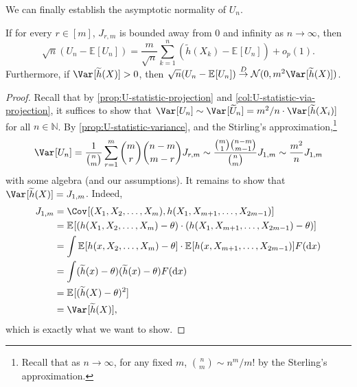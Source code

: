 We can finally establish the asymptotic normality of \(U_n\).

\begin{theorem}\label{thm:U-statistic}
	If for every \(r \in [m]\), \(J_{r, m}\) is bounded away from \(0\) and infinity as \(n \to \infty \), then
	\[
		\sqrt{n} (U_n - \mathbb{E}_{}[U_n] )
		= \frac{m}{\sqrt{n} } \sum_{k=1}^{n} (\widetilde{h} (X_k) - \mathbb{E}_{}[U_n] ) + o_p(1).
	\]
	Furthermore, if \(\Var_{}[\widetilde{h} (X)] > 0\), then \(\sqrt{n} (U_n - \mathbb{E}_{}[U_n] ) \overset{D}{\to} \mathcal{N} (0, m^2 \Var_{}[\widetilde{h} (X)] )\).
\end{theorem}
\begin{proof}
	Recall that by \autoref{prop:U-statistic-projection} and \autoref{col:U-statistic-via-projection}, it suffices to show that \(\Var_{}[U_n] \sim \Var_{}[\widetilde{U} _n] = m^2 / n \cdot \Var_{}[\widetilde{h} (X_i)]\) for all \(n \in \mathbb{N} \). By \autoref{prop:U-statistic-variance}, and the Stirling's approximation,\footnote{Recall that as \(n \to \infty \), for any fixed \(m\), \(\binom{n}{m} \sim n^m / m!\) by the Sterling's approximation.}
	\[
		\Var_{}[U_n]
		= \frac{1}{\binom{n}{m}} \sum_{r=1}^{m} \binom{m}{r} \binom{n-m}{m-r} J_{r, m}
		\sim \frac{\binom{m}{1} \binom{n-m}{m-1}}{\binom{n}{m}} J_{1, m}
		\sim \frac{m^2}{n} J_{1, m}
	\]
	with some algebra (and our assumptions). It remains to show that \(\Var_{}[\widetilde{h} (X)] = J_{1, m}\). Indeed,
	\[
		\begin{split}
			J_{1, m}
			 & = \Cov_{}[(X_1, X_2, \dots , X_m), h(X_1, X_{m+1}, \dots , X_{2m-1})]                                                       \\
			 & = \mathbb{E}_{}[(h(X_1, X_2, \dots , X_m) - \theta ) \cdot (h(X_1, X_{m+1}, \dots , X_{2m-1}) - \theta ) ]                  \\
			 & = \int \mathbb{E}_{}[h(x, X_2, \dots , X_m) - \theta ] \cdot \mathbb{E}_{}[h(x, X_{m+1}, \dots , X_{2m-1})] F(\mathrm{d} x) \\
			 & = \int (\widetilde{h} (x) - \theta ) (\widetilde{h} (x) - \theta ) F(\mathrm{d} x)                                          \\
			 & = \mathbb{E}_{}[(\widetilde{h} (X) - \theta )^2]                                                                            \\
			 & = \Var_{}[\widetilde{h} (X)] ,
		\end{split}
	\]
	which is exactly what we want to show.
\end{proof}

